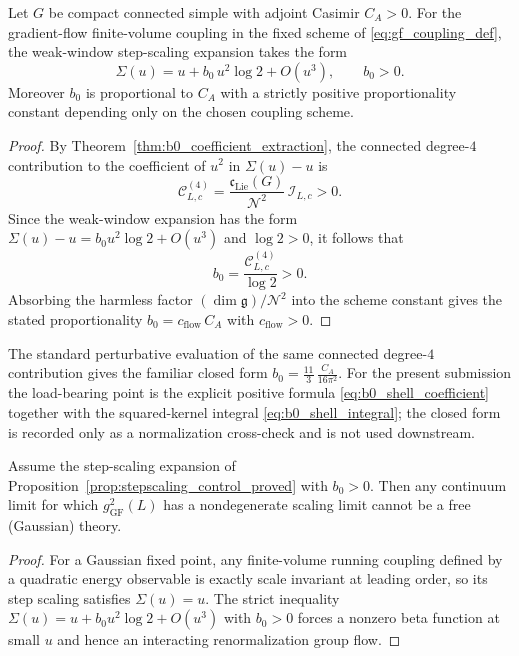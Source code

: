 \begin{lemma}\label{lem:b0_positive}
Let $G$ be compact connected simple with adjoint Casimir $C_A>0$.
For the gradient-flow finite-volume coupling in the fixed scheme of \eqref{eq:gf_coupling_def}, the weak-window step-scaling expansion takes the form
\begin{equation}\label{eq:b0_value}
 \Sigma(u)=u + b_0\,u^2\log 2 + O(u^3),\qquad b_0>0.
\end{equation}
Moreover $b_0$ is proportional to $C_A$ with a strictly positive proportionality constant depending only on the chosen coupling scheme.
\end{lemma}

\begin{proof}
By Theorem~\ref{thm:b0_coefficient_extraction}, the connected degree-$4$ contribution to the coefficient of $u^2$ in $\Sigma(u)-u$ is
\[
\mathcal C^{(4)}_{L,c}=\frac{\mathfrak c_{\mathrm{Lie}}(G)}{\mathcal N^2}\,\mathcal I_{L,c}>0.
\]
Since the weak-window expansion has the form $\Sigma(u)-u=b_0u^2\log 2+O(u^3)$ and $\log 2>0$, it follows that
\[
 b_0=\frac{\mathcal C^{(4)}_{L,c}}{\log 2}>0.
\]
Absorbing the harmless factor $(\dim\mathfrak g)/\mathcal N^2$ into the scheme constant gives the stated proportionality
$b_0=c_{\mathrm{flow}}\,C_A$ with $c_{\mathrm{flow}}>0$.
\end{proof}

\begin{remark}
The standard perturbative evaluation of the same connected degree-$4$ contribution gives the familiar closed form
$b_0=\tfrac{11}{3}\,\tfrac{C_A}{16\pi^2}$.
For the present submission the load-bearing point is the explicit positive formula \eqref{eq:b0_shell_coefficient} together with the squared-kernel integral \eqref{eq:b0_shell_integral};
the closed form is recorded only as a normalization cross-check and is not used downstream.
\end{remark}


\begin{proposition}\label{prop:nontriviality_from_stepscaling}
Assume the step-scaling expansion of Proposition~\ref{prop:stepscaling_control_proved} with $b_0>0$.
Then any continuum limit for which $g^2_{\mathrm{GF}}(L)$ has a nondegenerate scaling limit cannot be a free (Gaussian) theory.
\end{proposition}

\begin{proof}
For a Gaussian fixed point, any finite-volume running coupling defined by a quadratic energy observable is exactly scale invariant at leading order,
so its step scaling satisfies $\Sigma(u)=u$.
The strict inequality $\Sigma(u)=u+b_0u^2\log 2+O(u^3)$ with $b_0>0$ forces a nonzero beta function at small $u$ and hence an interacting
renormalization group flow.
\end{proof}




